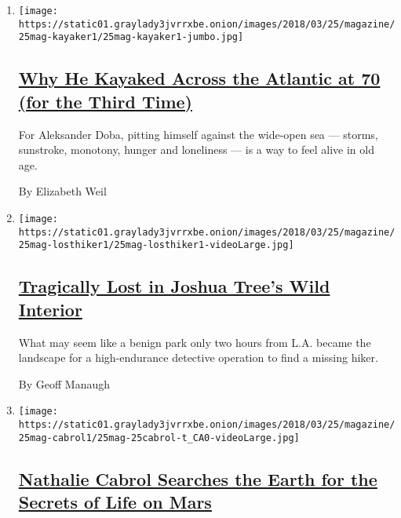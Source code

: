 \begin{enumerate}
\def\labelenumi{\arabic{enumi}.}
\item
  \texttt{[image: https://static01.graylady3jvrrxbe.onion/images/2018/03/25/magazine/25mag-kayaker1/25mag-kayaker1-jumbo.jpg]}

  \hypertarget{why-he-kayaked-across-the-atlantic-at-70-for-the-third-time}{%
  \subsection{\texorpdfstring{\href{/interactive/2018/03/22/magazine/voyages-kayaking-across-ocean-at-70.html}{Why
  He Kayaked Across the Atlantic at 70 (for the Third
  Time)}}{Why He Kayaked Across the Atlantic at 70 (for the Third Time)}}\label{why-he-kayaked-across-the-atlantic-at-70-for-the-third-time}}

  For Aleksander Doba, pitting himself against the wide-open sea ---
  storms, sunstroke, monotony, hunger and loneliness --- is a way to
  feel alive in old age.

  By Elizabeth Weil
\item
  \texttt{[image: https://static01.graylady3jvrrxbe.onion/images/2018/03/25/magazine/25mag-losthiker1/25mag-losthiker1-videoLarge.jpg]}

  \hypertarget{tragically-lost-in-joshua-trees-wild-interior}{%
  \subsection{\texorpdfstring{\href{/interactive/2018/03/22/magazine/voyages-joshua-tree-lost-hiker.html}{Tragically
  Lost in Joshua Tree's Wild
  Interior}}{Tragically Lost in Joshua Tree's Wild Interior}}\label{tragically-lost-in-joshua-trees-wild-interior}}

  What may seem like a benign park only two hours from L.A. became the
  landscape for a high-endurance detective operation to find a missing
  hiker.

  By Geoff Manaugh
\item
  \texttt{[image: https://static01.graylady3jvrrxbe.onion/images/2018/03/25/magazine/25mag-cabrol1/25mag-25cabrol-t\_CA0-videoLarge.jpg]}

  \hypertarget{nathalie-cabrol-searches-the-earth-for-the-secrets-of-life-on-mars}{%
  \subsection{\texorpdfstring{\href{/interactive/2018/03/22/magazine/voyages-nathalie-cabrol-searching-mars-life-on-earth.html}{Nathalie
  Cabrol Searches the Earth for the Secrets of Life on
  Mars}}{Nathalie Cabrol Searches the Earth for the Secrets of Life on Mars}}\label{nathalie-cabrol-searches-the-earth-for-the-secrets-of-life-on-mars}}


\end{enumerate}
